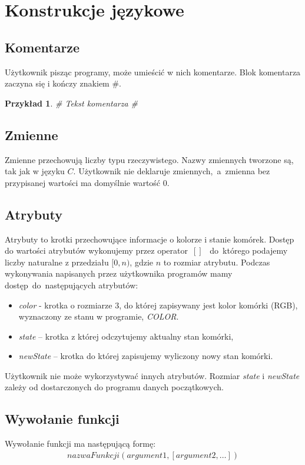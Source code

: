 \documentclass[declaration,shortabstract, inz]{iithesis}
\theoremstyle{definition} \newtheorem{definition}{Definicja}[]
\theoremstyle{plain} \newtheorem{remark}[definition]{Obserwacja}
\theoremstyle{plain} \newtheorem{theorem}[definition]{Twierdzenie}
\theoremstyle{plain} \newtheorem{example}{Przykład}[definition]
\theoremstyle{plain} \newtheorem{lemma}[definition]{Lemat}
\begin{document}
\section{Konstrukcje językowe}

\subsection{Komentarze}

Użytkownik pisząc programy, może umieścić w nich komentarze. Blok komentarza zaczyna się i kończy znakiem \#. 

\begin{example}
\# Tekst komentarza \#
\end{example}

\subsection{Zmienne}
Zmienne przechowują liczby typu rzeczywistego. Nazwy zmiennych tworzone są, tak jak w języku $C$. Użytkownik nie deklaruje zmiennych,~a~zmienna bez przypisanej wartości ma domyślnie wartość $0$.

\subsection{Atrybuty}
Atrybuty to krotki przechowujące informacje o kolorze i stanie komórek. Dostęp do wartości atrybutów wykonujemy przez operator~$[]$~ do~którego podajemy liczby naturalne z przedziału $[0, n)$, gdzie $n$ to rozmiar atrybutu. Podczas wykonywania napisanych przez użytkownika programów mamy dostęp~do~następujących atrybutów: 
	\begin{itemize}
	\item \textit{color} - krotka o rozmiarze $3$, do której zapisywany jest kolor komórki (RGB), wyznaczony ze stanu w programie, \textit{COLOR}. 
	\item \textit{state} -- krotka z której odczytujemy aktualny stan komórki,
	\item \textit{newState} -- krotka do której zapisujemy wyliczony nowy stan komórki.
	\end{itemize}
Użytkownik nie może wykorzystywać innych atrybutów. Rozmiar \textit{state} i \textit{newState} zależy od dostarczonych do programu danych początkowych. 	

\subsection{Wywołanie funkcji}
Wywołanie funkcji ma następującą formę:
\begin{align}
nazwaFunkcji(argument1,[argument2, \dots])
\end{align}
\end{document}
